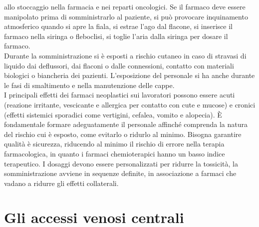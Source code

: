 allo stoccaggio nella farmacia e nei reparti oncologici. Se il farmaco deve essere manipolato prima di somministrarlo 
al paziente, si può provocare inquinamento atmosferico quando si apre la fiala, si estrae l’ago dal flacone, 
si inserisce il farmaco nella siringa o fleboclisi, si toglie l’aria dalla siringa per dosare il farmaco\cite{FNOPI}.\\ 
Durante la somministrazione si è esposti a rischio cutaneo in caso di stravasi di liquido dai deflussori, 
dai flaconi o dalle connessioni, contatto con materiali biologici o biancheria dei pazienti. 
L’esposizione del personale si ha anche durante le fasi di smaltimento e nella manutenzione delle cappe\cite{FNOPI}.\\
I principali effetti dei farmaci neoplastici sui lavoratori possono essere acuti (reazione irritante, vescicante e 
allergica per contatto con cute e mucose) e cronici (effetti sistemici sporadici come vertigini, cefalea, vomito e 
alopecia). È fondamentale formare adeguatamente il personale affinché comprenda la natura del rischio cui è esposto, 
come evitarlo o ridurlo al minimo. Bisogna garantire qualità è sicurezza, riducendo al minimo il rischio di errore 
nella terapia farmacologica, in quanto i farmaci chemioterapici hanno un basso indice terapeutico. I dosaggi devono 
essere personalizzati per ridurre la tossicità, la somministrazione avviene in sequenze definite, 
in associazione a farmaci che vadano a ridurre gli effetti collaterali. %

\section{Gli accessi venosi centrali}

